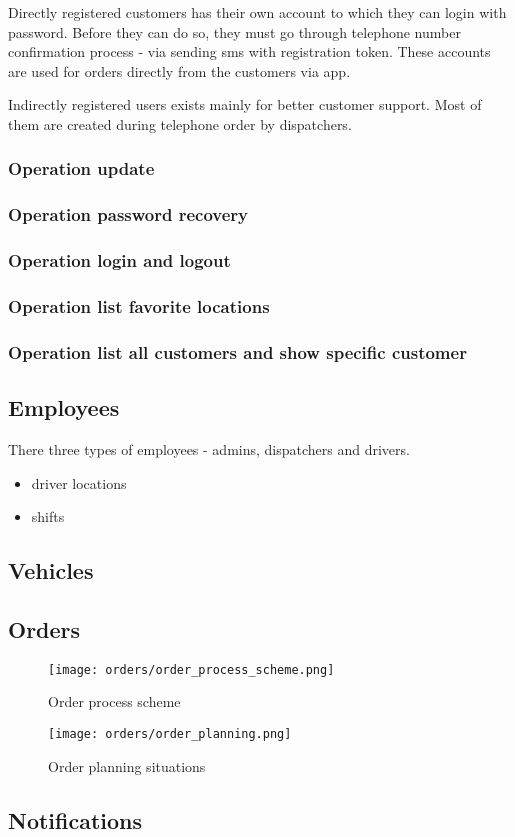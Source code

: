 Directly registered customers has their own account to which they can login with password. Before they can do so, they must go through telephone number confirmation process - via sending sms with registration token. These accounts are used for orders directly from the customers via app.

Indirectly registered users exists mainly for better customer support. Most of them are created during telephone order by dispatchers.
\subsubsection{Operation update}
\subsubsection{Operation password recovery}
\subsubsection{Operation login and logout}
\subsubsection{Operation list favorite locations}
\subsubsection{Operation list all customers and show specific customer}

\subsection{Employees}
There three types of employees - admins, dispatchers and drivers.
\begin{itemize}
	\item driver locations
	\item shifts
\end{itemize}
\subsection{Vehicles}

\subsection{Orders}

\begin{figure}[h]\centering
	\texttt{[image: orders/order\_process\_scheme.png]}
	\caption{Order process scheme}\label{order-process-scheme}
\end{figure}

\begin{figure}[h]\centering
	\texttt{[image: orders/order\_planning.png]}
	\caption{Order planning situations}\label{order-process-scheme}
\end{figure} 
\subsection{Notifications}
